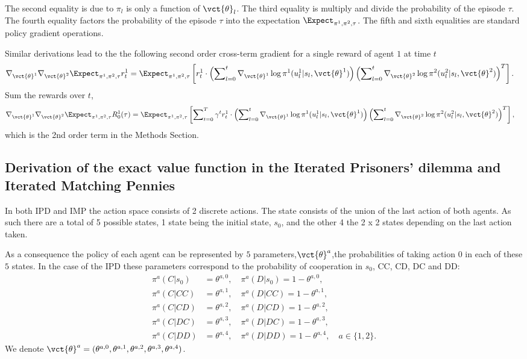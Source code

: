 The second equality is due to $\pi_l$ is only a function of $\vct{\theta}_l$. The third equality is multiply and divide the probability of the episode $\tau$. The fourth equality factors the probability of the episode $\tau$ into the expectation $\Expect_{\pi^1, \pi^2, \tau}$. The fifth and sixth equalities are standard policy gradient operations.



Similar derivations lead to the the following second order cross-term gradient for a single reward of agent $1$ at time $t$
\begin{align*}
\nabla_{\vct{\theta}^1}\nabla_{\vct{\theta}^2} \Expect_{\pi^1, \pi^2, \tau} r^1_t &= \Expect_{\pi^1, \pi^2, \tau} \left[r^1_t \cdot\left( \sum\nolimits_{l=0}^t \nabla_{\vct{\theta}^1} \log \pi^1(u^1_l|s_l, \vct{\theta}^1) \right) \left(\sum\nolimits_{l=0}^t \nabla_{\vct{\theta}^2} \log \pi^2(u^2_l|s_l, \vct{\theta}^2) \right)^T \right].
\end{align*}
Sum the rewards over $t$,
\begin{align*}
\nabla_{\vct{\theta}^1}\nabla_{\vct{\theta}^2} \Expect_{\pi^1, \pi^2, \tau} R^1_0(\tau) &= \Expect_{\pi^1, \pi^2, \tau} \left[\sum\nolimits_{t=0}^{T} \gamma^t r^1_t\cdot  \left( \sum\nolimits_{l=0}^t \nabla_{\vct{\theta}^1} \log \pi^1(u^1_l|s_l, \vct{\theta}^1)\right)
\left( \sum\nolimits_{l=0}^t \nabla_{\vct{\theta}^2} \log \pi^2(u^2_l|s_l, \vct{\theta}^2) \right)^T \right],
\end{align*}
which is the 2nd order term in the Methods Section.



\subsection{Derivation of the exact value function in the Iterated Prisoners' dilemma and Iterated Matching Pennies}
\label{sec:discount-rew}
In both IPD and IMP the action space consists of 2 discrete actions. 
The state consists of the union of the last action of both agents. As such there are a total of 5 possible states, 1 state being the initial state, $s_0$,  and the other 4 the 2 x 2 states depending on the last action taken.

As a consequence the policy of each agent can be represented by $5$ parameters,$\vct{\theta}^{a}$,the probabilities of taking action $0$ in each of these $5$ states. In the case of the IPD these parameters correspond to the probability of cooperation in $s_0$, CC, CD, DC and DD:
\begin{align*}
\pi^a(C|s_0) & = {\theta}^{a, 0}, \quad \pi^a(D|s_0)  = 1 - {\theta}^{a, 0}, \\
\pi^a(C|CC) &= {\theta}^{a, 1}, \quad \pi^a(D|CC) = 1- {\theta}^{a,1}, \\
\pi^a(C|CD) &= {\theta}^{a, 2}, \quad \pi^a(D|CD) = 1- {\theta}^{a,2}, \\
\pi^a(C|DC) &= {\theta}^{a, 3}, \quad \pi^a(D|DC) = 1- {\theta}^{a,3}, \\
\pi^a(C|DD) &= {\theta}^{a, 4}, \quad \pi^a(D|DD) = 1- {\theta}^{a,4}, \quad a \in \{1, 2\}.
\end{align*}
We denote $\vct{\theta}^a=({\theta}^{a,0}, {\theta}^{a,1}, {\theta}^{a,2}, {\theta}^{a,3}, {\theta}^{a,4})$. 

